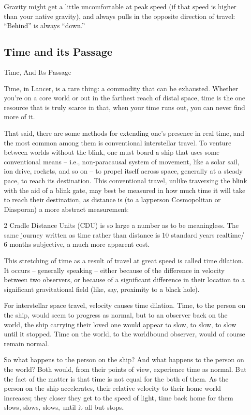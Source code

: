 Gravity might get a little uncomfortable at peak speed (if that speed is higher than your  
native gravity), and always pulls in the opposite direction of travel: “Behind” is always  
“down.” 
 
\subsection{Time and its Passage}
Time, And Its Passage  

Time, in Lancer, is a rare thing: a commodity that can be exhausted. Whether you’re on a core  
world or out in the farthest reach of distal space, time is the one resource that is truly scarce in  
that, when your time runs out, you can never find more of it.  

That said, there are some methods for extending one’s presence in real time, and the most  
common among them is conventional interstellar travel. To venture between worlds without the  
blink, one must board a ship that uses some conventional means  -- i.e., non-paracausal system  
of movement, like a solar sail, ion drive, rockets, and so on -- to propel itself across space,  
generally at a steady pace, to reach its destination. This conventional travel, unlike traversing the  
blink with the aid of a blink gate, may best be measured in how much time it will take to reach  
their destination, as distance is (to a layperson Cosmopolitan or Diasporan) a more abstract  
measurement:  

2 Cradle Distance Units (CDU) is so large a number as to be meaningless. The same journey  
written as time rather than distance is 10 standard years realtime/ 6 months subjective, a much  
more apparent cost.   

This stretching of time as a result of travel at great speed is called time dilation. It occurs --  
generally speaking -- either because of the difference in velocity between two observers, or  
because of a significant difference in their location to a significant gravitational field (like,  
say, proximity to a black hole).  

For interstellar space travel, velocity causes time dilation. Time, to the person on the ship,  
would seem to progress as normal, but to an observer back on the world, the ship carrying  
their loved one would appear to slow, to slow, to slow until it stopped. Time on the world, to  
the worldbound observer, would of course remain normal.   

So what happens to the person on the ship? And what happens to the person on the world?  
Both would, from their points of view, experience time as normal. But the fact of the matter  
is that time is not equal for the both of them. As the person on the ship accelerates, their  
relative velocity to their home world increases; they closer they get to the speed of light,  
time back home for them slows, slows, slows, until it all but stops.   

